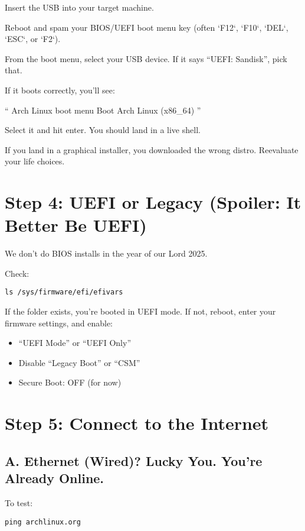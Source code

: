 \documentclass[12pt,openany]{book}
\begin{document}
Insert the USB into your target machine.

Reboot and spam your BIOS/UEFI boot menu key (often `F12`, `F10`, `DEL`, `ESC`, or `F2`).

From the boot menu, select your USB device. If it says “UEFI: Sandisk”, pick that.

If it boots correctly, you'll see:

``
Arch Linux boot menu
Boot Arch Linux (x86\_64)
''


Select it and hit enter. You should land in a live shell.

If you land in a graphical installer, you downloaded the wrong distro. Reevaluate your life choices.

\section*{Step 4: UEFI or Legacy (Spoiler: It Better Be UEFI)}

We don't do BIOS installs in the year of our Lord 2025.

Check:
\begin{lstlisting}
ls /sys/firmware/efi/efivars
\end{lstlisting}

If the folder exists, you’re booted in UEFI mode.  
If not, reboot, enter your firmware settings, and enable:

\begin{itemize}
  \item “UEFI Mode” or “UEFI Only”
  \item Disable “Legacy Boot” or “CSM”
  \item Secure Boot: OFF (for now)
\end{itemize}

\section*{Step 5: Connect to the Internet}

\subsection*{A. Ethernet (Wired)? Lucky You. You're Already Online.}

To test:
\begin{lstlisting}
ping archlinux.org
\end{lstlisting}
\end{document}
